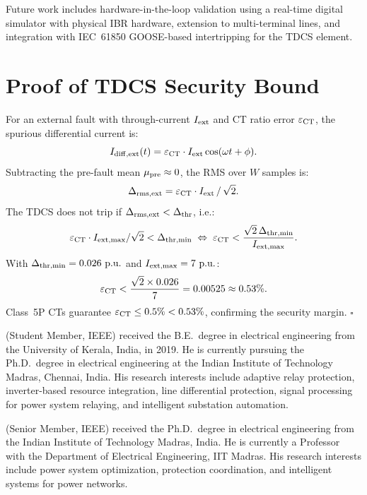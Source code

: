 \documentclass[journal,twoside,10pt]{IEEEtran}
\newcommand{\pu}{\,\text{p.u.}}
\begin{document}
Future work includes hardware-in-the-loop validation using a real-time
digital simulator with physical IBR hardware, extension to multi-terminal
lines, and integration with IEC~61850 GOOSE-based intertripping for the
TDCS element.

\appendix
\section{Proof of TDCS Security Bound}
\label{app:tdcs}

For an external fault with through-current $I_{\rm ext}$ and CT ratio
error $\varepsilon_{\rm CT}$, the spurious differential current is:
\begin{equation}
  I_{\mathrm{diff,ext}}(t) = \varepsilon_{\rm CT} \cdot I_{\rm ext} \cos(\omega t + \phi).
\end{equation}
Subtracting the pre-fault mean $\mu_{\rm pre} \approx 0$, the RMS over
$W$ samples is:
\begin{equation}
  \Delta_{\rm rms,ext} = \varepsilon_{\rm CT} \cdot I_{\rm ext} \,/\, \sqrt{2}.
\end{equation}
The TDCS does not trip if $\Delta_{\rm rms,ext} < \Delta_{\rm thr}$, i.e.:
\begin{equation}
  \varepsilon_{\rm CT} \cdot I_{\rm ext,max} / \sqrt{2} < \Delta_{\rm thr,min}
  \;\Leftrightarrow\;
  \varepsilon_{\rm CT} < \frac{\sqrt{2}\,\Delta_{\rm thr,min}}{I_{\rm ext,max}}.
\end{equation}
With $\Delta_{\rm thr,min} = 0.026\,\pu$ and $I_{\rm ext,max} = 7\,\pu$:
\begin{equation}
  \varepsilon_{\rm CT} < \frac{\sqrt{2} \times 0.026}{7} = 0.00525
  \approx 0.53\%.
\end{equation}
Class~5P CTs guarantee $\varepsilon_{\rm CT} \leq 0.5\% < 0.53\%$,
confirming the security margin. $\square$




\vfill

(Student Member, IEEE) received the B.E.\ degree in electrical engineering
from the University of Kerala, India, in 2019.
He is currently pursuing the Ph.D.\ degree in electrical engineering at the
Indian Institute of Technology Madras, Chennai, India.
His research interests include adaptive relay protection, inverter-based
resource integration, line differential protection, signal processing for
power system relaying, and intelligent substation automation.

(Senior Member, IEEE) received the Ph.D.\ degree in electrical engineering
from the Indian Institute of Technology Madras, India.
He is currently a Professor with the Department of Electrical Engineering,
IIT Madras.
His research interests include power system optimization, protection
coordination, and intelligent systems for power networks.
\end{document}
